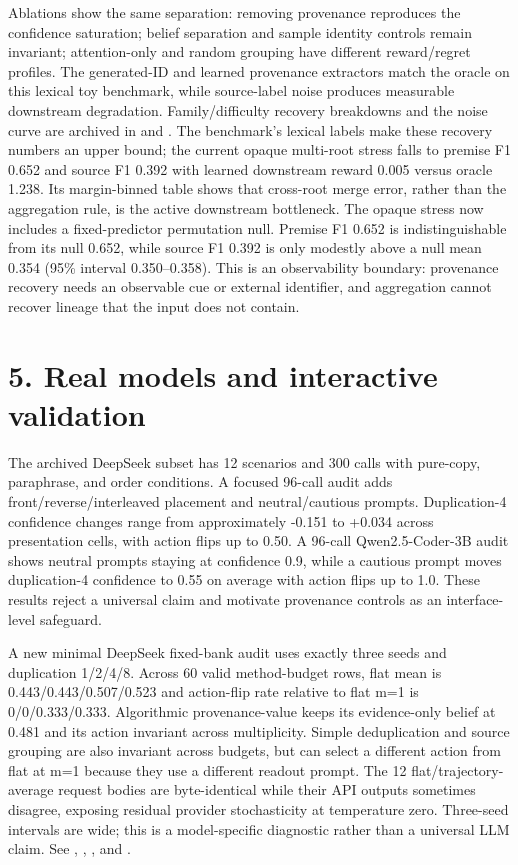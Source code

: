 \documentclass[10pt]{article}
\begin{document}
Ablations show the same separation: removing provenance reproduces the confidence saturation; belief separation and sample identity controls remain invariant; attention-only and random grouping have different reward/regret profiles. The generated-ID and learned provenance extractors match the oracle on this lexical toy benchmark, while source-label noise produces measurable downstream degradation. Family/difficulty recovery breakdowns and the noise curve are archived in \texttt{} and \texttt{}. The benchmark's lexical labels make these recovery numbers an upper bound; the current opaque multi-root stress falls to premise F1 0.652 and source F1 0.392 with learned downstream reward 0.005 versus oracle 1.238. Its margin-binned table shows that cross-root merge error, rather than the aggregation rule, is the active downstream bottleneck. The opaque stress now includes a fixed-predictor permutation null. Premise F1 0.652 is indistinguishable from its null 0.652, while source F1 0.392 is only modestly above a null mean 0.354 (95\% interval 0.350--0.358). This is an observability boundary: provenance recovery needs an observable cue or external identifier, and aggregation cannot recover lineage that the input does not contain.

\section{5. Real models and interactive validation}

The archived DeepSeek subset has 12 scenarios and 300 calls with pure-copy, paraphrase, and order conditions. A focused 96-call audit adds front/reverse/interleaved placement and neutral/cautious prompts. Duplication-4 confidence changes range from approximately -0.151 to +0.034 across presentation cells, with action flips up to 0.50. A 96-call Qwen2.5-Coder-3B audit shows neutral prompts staying at confidence 0.9, while a cautious prompt moves duplication-4 confidence to 0.55 on average with action flips up to 1.0. These results reject a universal claim and motivate provenance controls as an interface-level safeguard.

A new minimal DeepSeek fixed-bank audit uses exactly three seeds and duplication 1/2/4/8. Across 60 valid method-budget rows, flat mean \texttt{} is 0.443/0.443/0.507/0.523 and action-flip rate relative to flat m=1 is 0/0/0.333/0.333. Algorithmic provenance-value keeps its evidence-only belief at 0.481 and its action invariant across multiplicity. Simple deduplication and source grouping are also invariant across budgets, but can select a different action from flat at m=1 because they use a different readout prompt. The 12 flat/trajectory-average request bodies are byte-identical while their API outputs sometimes disagree, exposing residual provider stochasticity at temperature zero. Three-seed intervals are wide; this is a model-specific diagnostic rather than a universal LLM claim. See \texttt{}, \texttt{}, \texttt{}, and \texttt{}.
\end{document}
